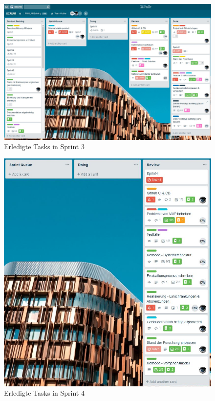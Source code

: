 \documentclass[a4paper]{scrreprt}
\begin{document}
\begin{figure}[h!]
	\includegraphics[keepaspectratio,width=\textwidth]{SprintReview_3}
	\caption{Erledigte Tasks in Sprint 3}
\end{figure}

\newpage

\begin{figure}[h!]
	\includegraphics[keepaspectratio,width=\textwidth]{SprintReview_4}
	\caption{Erledigte Tasks in Sprint 4}
\end{figure}
\end{document}
